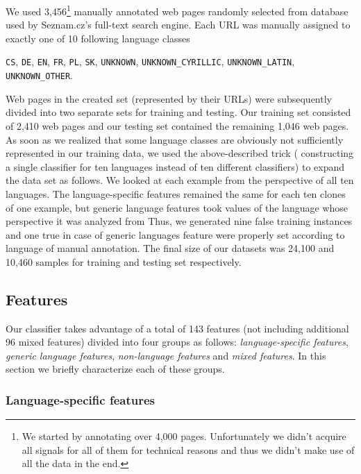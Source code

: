 \documentclass{acm_proc_article-sp}
\begin{document}
  We used 3,456\footnote{We started by annotating over 4,000 pages.
  Unfortunately we didn't acquire all signals for all of them for technical reasons and thus
  we didn't make use of all the data in the end.} manually annotated 
  web pages randomly selected from database
  used by Seznam.cz's full-text search engine. Each URL was manually assigned
  to exactly one of 10 following language classes {\texttt{CS}, \texttt{DE},
  \texttt{EN}, \texttt{FR}, \texttt{PL}, \texttt{SK}, \texttt{UNKNOWN}, 
  \texttt{UNKNOWN\_CYRILLIC}, \texttt{UNKNOWN\_LATIN},
  \texttt{UNKNOWN\_OTHER}. 
  
  Web pages in the created set (represented by their
  URLs) were subsequently divided into two separate sets for training and
  testing. Our training set consisted of 2,410 web pages and our testing set
  contained the remaining 1,046 web pages. As soon as we realized that some
  language classes are obviously not sufficiently represented in our training
  data, we used the above-described trick ( constructing a single classifier for
  ten languages instead of ten different classifiers) to expand the data set as follows. 
  We looked at each example from the perspective of all ten languages. The 
  language-specific features remained the same for each ten clones of one example,
  but generic language features took values of the language whose perspective
  it was analyzed from  Thus, we generated nine false training instances and 
  one true in case of generic languages feature were properly set according to 
  language of manual  annotation. The final size of our datasets was
  24,100 and 10,460 samples for training and testing set respectively.


  \subsection{Features}
  Our classifier takes advantage of a total of 143 features (not including additional 96 mixed features) divided into four groups
  as follows: \textit{language-specific features}, \textit{generic language features}, \textit{non-language
  features} and \textit{mixed features}. In this section we briefly characterize each of these
  groups.

\subsubsection{Language-specific features}

}
\end{document}
